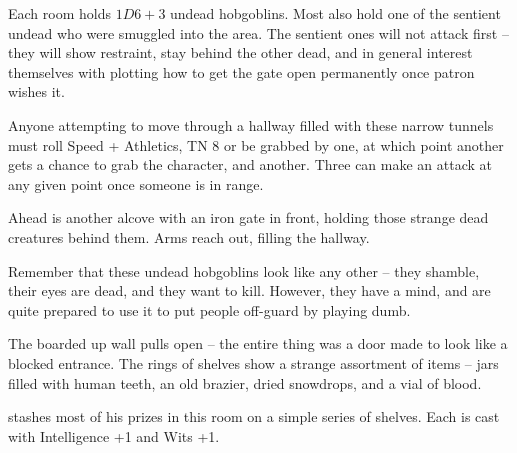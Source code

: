 \begin{multicols}{2}
Each room holds $1D6+3$ undead hobgoblins.  Most also hold one of the sentient undead who were smuggled into the area.  The sentient ones will not attack first -- they will show restraint, stay behind the other dead, and in general interest themselves with plotting how to get the gate open permanently once \gls{patron} wishes it.



Anyone attempting to move through a hallway filled with these narrow tunnels must roll Speed + Athletics, TN 8 or be grabbed by one, at which point another gets a chance to grab the character, and another.  Three can make an attack at any given point once someone is in range.

\begin{boxtext}

	Ahead is another alcove with an iron gate in front, holding those strange dead creatures behind them.  Arms reach out, filling the hallway.

\end{boxtext}


Remember that these undead hobgoblins look like any other -- they shamble, their eyes are dead, and they want to kill.
However, they have a mind, and are quite prepared to use it to put people off-guard by playing dumb.



\begin{boxtext}

	The boarded up wall pulls open -- the entire thing was a door made to look like a blocked entrance.  The rings of shelves show a strange assortment of items -- jars filled with human teeth, an old brazier, dried snowdrops, and a vial of blood.

\end{boxtext}

 stashes most of his prizes in this room on a simple series of shelves.  Each is cast with Intelligence +1 and Wits +1.

\begin{enumerate}


\end{enumerate}
\end{multicols}
